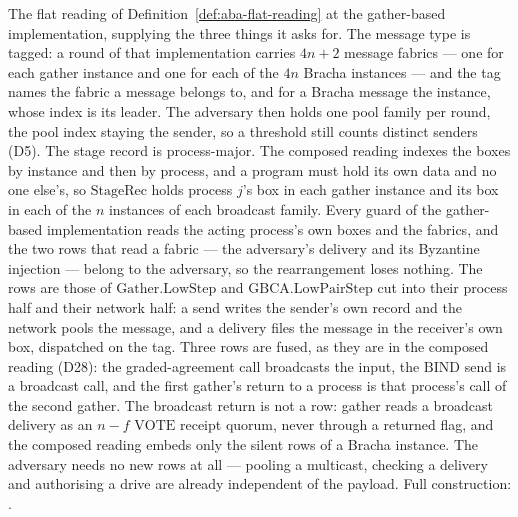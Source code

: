 \begin{definition}
  \label{def:aba-protocolg}
  \leanok
  The flat reading of Definition~\ref{def:aba-flat-reading} at the gather-based implementation, supplying the three things it asks for.
  The message type is tagged: a round of that implementation carries $4n+2$ message fabrics --- one for each gather instance and one for each of the $4n$ Bracha instances --- and the tag names the fabric a message belongs to, and for a Bracha message the instance, whose index is its leader.
  The adversary then holds one pool family per round, the pool index staying the sender, so a threshold still counts distinct senders (D5).
  The stage record is process-major.
  The composed reading indexes the boxes by instance and then by process, and a program must hold its own data and no one else's, so $\mathrm{StageRec}$ holds process $j$'s box in each gather instance and its box in each of the $n$ instances of each broadcast family.
  Every guard of the gather-based implementation reads the acting process's own boxes and the fabrics, and the two rows that read a fabric --- the adversary's delivery and its Byzantine injection --- belong to the adversary, so the rearrangement loses nothing.
  The rows are those of $\mathrm{Gather.LowStep}$ and $\mathrm{GBCA.LowPairStep}$ cut into their process half and their network half: a send writes the sender's own record and the network pools the message, and a delivery files the message in the receiver's own box, dispatched on the tag.
  Three rows are fused, as they are in the composed reading (D28): the graded-agreement call broadcasts the input, the $\mathrm{BIND}$ send is a broadcast call, and the first gather's return to a process is that process's call of the second gather.
  The broadcast return is not a row: gather reads a broadcast delivery as an $n-f$ $\mathrm{VOTE}$ receipt quorum, never through a returned flag, and the composed reading embeds only the silent rows of a Bracha instance.
  The adversary needs no new rows at all --- pooling a multicast, checking a delivery and authorising a drive are already independent of the payload.
  Full construction: .
\end{definition}
